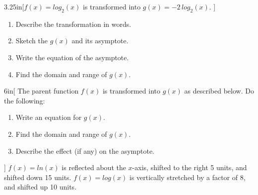 \begin{myWideProblem}{3.25in}[$f(x) = log_2(x)$ is transformed into $g(x)=-2 \, log_2(x) $. ]
    {
        \small
        \begin{minipage}{0.54\textwidth}
            \begin{enumerate}[nosep]
                \item Describe the transformation in words.
                \item Sketch the $g(x)$ and its asymptote.
            \end{enumerate}
        \end{minipage}
        \hfil
        \begin{minipage}{0.45\textwidth}
            \begin{enumerate}[nosep]
                \setcounter{enumi}{2}
                \item Write the equation of the asymptote.
                \item Find the domain and range of $g(x)$.
            \end{enumerate}
        \end{minipage}
    }
\end{myWideProblem}


\begin{my2Problems}{6in}[%
        The parent function $f(x)$ is transformed into $g(x)$ as described below.
        Do the following:
        \begin{enumerate}[nosep,topsep=-0.5\onelineskip]
            \item Write an equation for $g(x)$.
            \item Find the domain and range of $g(x)$.
            \item Describe the effect (if any) on the asymptote.
        \end{enumerate}
    ]
    {
        $f(x) = ln(x)$ is 
        reflected about the $x$-axis, 
        shifted to the right 5 units, and 
        shifted down 15 units.
    }
    {
        $f(x) = log(x)$ is vertically stretched by a factor of 8,
        and shifted up 10 units.
    }
\end{my2Problems}
